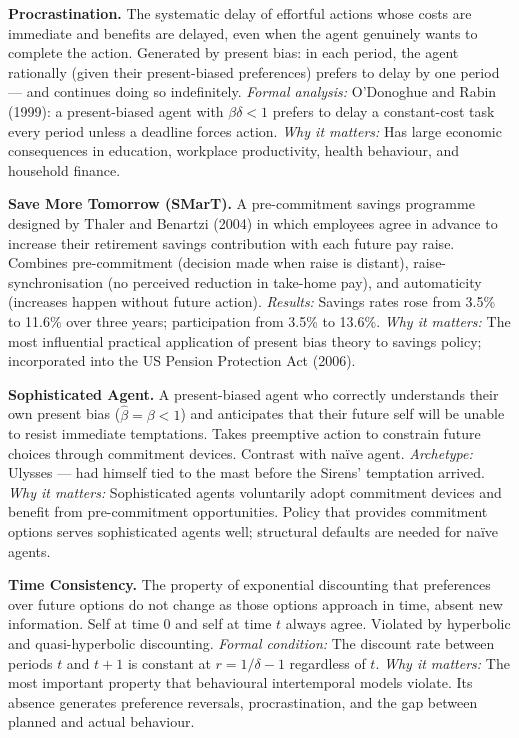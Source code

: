 \documentclass[12pt, letterpaper]{article}
\begin{document}
\textbf{Procrastination.} The systematic delay of effortful actions whose costs are immediate and benefits are delayed, even when the agent genuinely wants to complete the action. Generated by present bias: in each period, the agent rationally (given their present-biased preferences) prefers to delay by one period --- and continues doing so indefinitely. \textit{Formal analysis:} O'Donoghue and Rabin (1999): a present-biased agent with $\beta\delta < 1$ prefers to delay a constant-cost task every period unless a deadline forces action. \textit{Why it matters:} Has large economic consequences in education, workplace productivity, health behaviour, and household finance.

\textbf{Save More Tomorrow (SMarT).} A pre-commitment savings programme designed by Thaler and Benartzi (2004) in which employees agree in advance to increase their retirement savings contribution with each future pay raise. Combines pre-commitment (decision made when raise is distant), raise-synchronisation (no perceived reduction in take-home pay), and automaticity (increases happen without future action). \textit{Results:} Savings rates rose from 3.5\% to 11.6\% over three years; participation from 3.5\% to 13.6\%. \textit{Why it matters:} The most influential practical application of present bias theory to savings policy; incorporated into the US Pension Protection Act (2006).

\textbf{Sophisticated Agent.} A present-biased agent who correctly understands their own present bias ($\hat{\beta} = \beta < 1$) and anticipates that their future self will be unable to resist immediate temptations. Takes preemptive action to constrain future choices through commitment devices. Contrast with naïve agent. \textit{Archetype:} Ulysses --- had himself tied to the mast before the Sirens' temptation arrived. \textit{Why it matters:} Sophisticated agents voluntarily adopt commitment devices and benefit from pre-commitment opportunities. Policy that provides commitment options serves sophisticated agents well; structural defaults are needed for naïve agents.

\textbf{Time Consistency.} The property of exponential discounting that preferences over future options do not change as those options approach in time, absent new information. Self at time 0 and self at time $t$ always agree. Violated by hyperbolic and quasi-hyperbolic discounting. \textit{Formal condition:} The discount rate between periods $t$ and $t+1$ is constant at $r = 1/\delta - 1$ regardless of $t$. \textit{Why it matters:} The most important property that behavioural intertemporal models violate. Its absence generates preference reversals, procrastination, and the gap between planned and actual behaviour.
\end{document}
